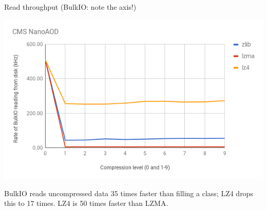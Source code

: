 \documentclass{beamer}
\begin{document}
\begin{frame}{Read throughput (BulkIO: note the axis!)}
\begin{center}
\includegraphics[width=\linewidth]{bulk-vs-compression.png}
\end{center}

BulkIO reads uncompressed data 35 times faster than filling a class; LZ4 drops this to 17 times. LZ4 is 50 times faster than LZMA.
\end{frame}
\end{document}
